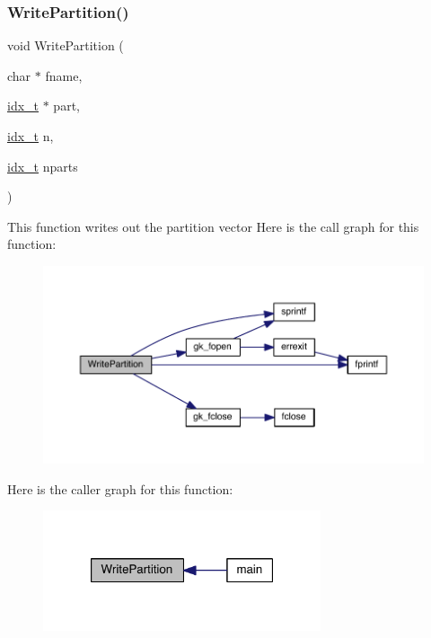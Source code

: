\subsubsection{\texorpdfstring{Write\+Partition()}{WritePartition()}}
{\footnotesize\ttfamily void Write\+Partition (\begin{DoxyParamCaption}\item[{char $\ast$}]{fname,  }\item[{\hyperlink{a00876_aaa5262be3e700770163401acb0150f52}{idx\+\_\+t} $\ast$}]{part,  }\item[{\hyperlink{a00876_aaa5262be3e700770163401acb0150f52}{idx\+\_\+t}}]{n,  }\item[{\hyperlink{a00876_aaa5262be3e700770163401acb0150f52}{idx\+\_\+t}}]{nparts }\end{DoxyParamCaption})}

This function writes out the partition vector Here is the call graph for this function\+:\nopagebreak
\begin{figure}[H]
\begin{center}
\leavevmode
\includegraphics[width=350pt]{a00858_ab677f01037192ca57a5a167df7d350d3_cgraph}
\end{center}
\end{figure}
Here is the caller graph for this function\+:\nopagebreak
\begin{figure}[H]
\begin{center}
\leavevmode
\includegraphics[width=232pt]{a00858_ab677f01037192ca57a5a167df7d350d3_icgraph}
\end{center}
\end{figure}
\mbox{\label{a00858_a902cc00039a655f4b6ec0292e0410ef2}} 
